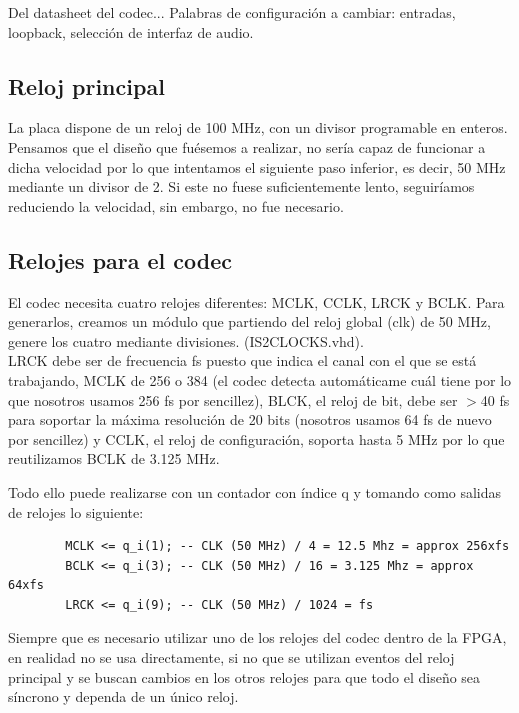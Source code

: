 \textcolor{rosa}{Del datasheet del codec... Palabras de configuración a cambiar: entradas, loopback, selección de interfaz de audio.}


	\subsection{Reloj principal}
		La placa dispone de un reloj de 100 MHz, con un divisor programable en enteros. Pensamos que el diseño que fuésemos a realizar, no sería capaz de funcionar a dicha velocidad por lo que intentamos el siguiente paso inferior, es decir, 50 MHz mediante un divisor de 2. Si este no fuese suficientemente lento, seguiríamos reduciendo la velocidad, sin embargo, no fue necesario.\\
		


	\subsection{Relojes para el codec}

		El codec necesita cuatro relojes diferentes: MCLK, CCLK, LRCK y BCLK. Para generarlos, creamos un módulo que partiendo del reloj global (clk) de 50 MHz, genere los cuatro mediante divisiones. (IS2CLOCKS.vhd).\\

		LRCK debe ser de frecuencia fs puesto que indica el canal con el que se está trabajando, MCLK de 256 o 384 (el codec detecta automáticame cuál tiene por lo que nosotros usamos 256 fs por sencillez), BLCK, el reloj de bit, debe ser $>$40 fs para soportar la máxima resolución de 20 bits (nosotros usamos 64 fs de nuevo por sencillez) y CCLK, el reloj de configuración, soporta hasta 5 MHz por lo que reutilizamos BCLK de 3.125 MHz.

		Todo ello puede realizarse con un contador con índice q y tomando como salidas de relojes lo siguiente:

		\begin{verbatim}
		MCLK <= q_i(1); -- CLK (50 MHz) / 4 = 12.5 Mhz = approx 256xfs
		BCLK <= q_i(3); -- CLK (50 MHz) / 16 = 3.125 Mhz = approx 64xfs
		LRCK <= q_i(9); -- CLK (50 MHz) / 1024 = fs
		\end{verbatim} 

		Siempre que es necesario utilizar uno de los relojes del codec dentro de la FPGA, en realidad no se usa directamente, si no que se utilizan eventos del reloj principal y se buscan cambios en los otros relojes para que todo el diseño sea síncrono y dependa de un único reloj.


